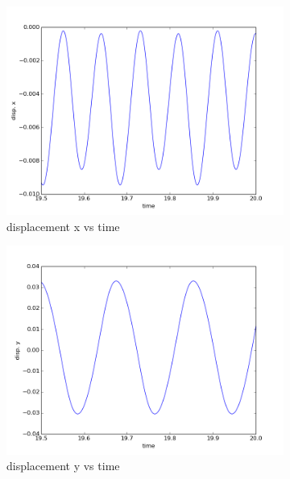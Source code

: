 \begin{figure}[!ht]
\begin{subfigure}[b]{0.5\linewidth}
\includegraphics[width=\linewidth]{figures/FSI3/medium/X_disp}\caption{displacement x vs time}
\end{subfigure}
\begin{subfigure}[b]{0.5\linewidth}
\includegraphics[width=\linewidth]{figures/FSI3/medium/Y_disp}\caption{displacement y vs time}
\end{subfigure}
\begin{subfigure}[b]{0.47\linewidth}

\end{subfigure}
\end{figure}
